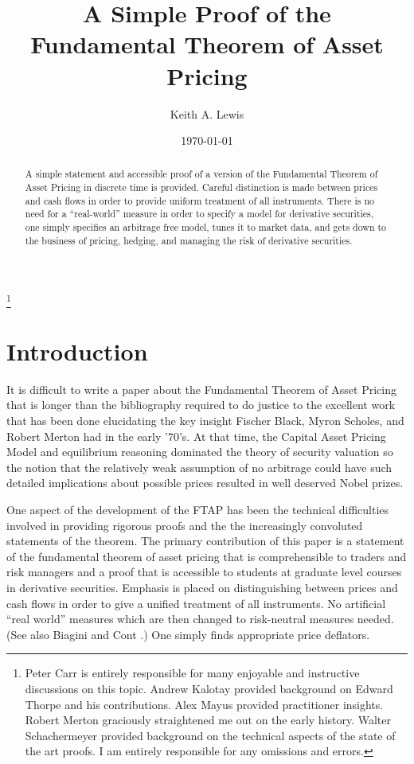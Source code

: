 \documentclass[fleqn]{amsart}
\title{A Simple Proof of the Fundamental Theorem of Asset Pricing}
\author{Keith A. Lewis}
\date{\today}
\begin{document}
\begin{abstract}
A simple statement and accessible proof of a version of the Fundamental
Theorem of Asset Pricing in discrete time is provided. Careful distinction
is made between prices and cash flows in order to provide uniform treatment
of all instruments. There is no need for a ``real-world''
measure in order to specify a model for derivative securities,
one simply specifies an arbitrage free model, tunes it to market data,
and gets down to the business of pricing, hedging, and managing the
risk of derivative securities.
\end{abstract}
\address{KALX, LLC \tt{\url{http://kalx.net}}}
\thanks{Peter Carr is entirely responsible for many
enjoyable and instructive discussions on this topic.
Andrew Kalotay provided background on Edward Thorpe and his contributions.
Alex Mayus provided practitioner insights.
Robert Merton graciously straightened me out on the early history.
Walter Schachermeyer provided background on the
technical aspects of the state of the art proofs.
I am entirely responsible for any omissions and errors.
}

\maketitle

\section{Introduction}
It is difficult to write a paper about the Fundamental Theorem of Asset
Pricing that is longer than the bibliography required to do justice to
the excellent work that has been done elucidating the key insight Fischer
Black, Myron Scholes, and Robert Merton had in the early '70's. At that
time, the Capital Asset Pricing Model and equilibrium reasoning dominated
the theory of security valuation so the notion that the relatively weak
assumption of no arbitrage could have such detailed implications about
possible prices resulted in well deserved Nobel prizes.

One aspect of the development of the FTAP has been the
technical difficulties involved in providing rigorous proofs and the
the increasingly convoluted statements of the theorem.
The primary contribution of this paper is a statement of the fundamental
theorem of asset pricing that is comprehensible to traders and risk
managers and a proof that is accessible to students at graduate level
courses in derivative securities. Emphasis is placed on distinguishing
between prices and cash flows in order to give a unified treatment of
all instruments. No artificial ``real world'' measures which are then
changed to risk-neutral measures needed. (See also Biagini and Cont
\cite{BiaCon2006}.)  One simply finds appropriate price deflators.
\end{document}
